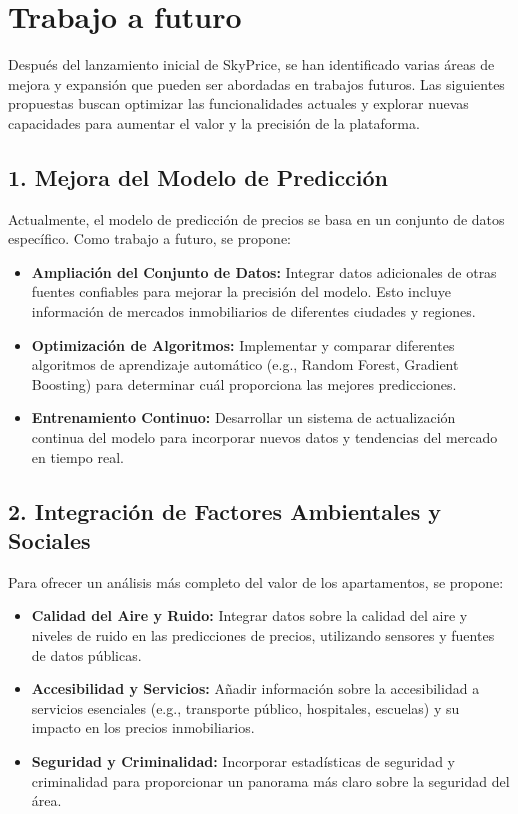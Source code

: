 \chapter{\textcolor{azulescom}{Trabajo a futuro}}

Después del lanzamiento inicial de SkyPrice, se han identificado varias áreas de mejora y expansión que pueden ser abordadas en trabajos futuros. Las siguientes propuestas buscan optimizar las funcionalidades actuales y explorar nuevas capacidades para aumentar el valor y la precisión de la plataforma.

\section*{1. Mejora del Modelo de Predicción}
Actualmente, el modelo de predicción de precios se basa en un conjunto de datos específico. Como trabajo a futuro, se propone:
\begin{itemize}
    \item \textbf{Ampliación del Conjunto de Datos:} Integrar datos adicionales de otras fuentes confiables para mejorar la precisión del modelo. Esto incluye información de mercados inmobiliarios de diferentes ciudades y regiones.
    \item \textbf{Optimización de Algoritmos:} Implementar y comparar diferentes algoritmos de aprendizaje automático (e.g., Random Forest, Gradient Boosting) para determinar cuál proporciona las mejores predicciones.
    \item \textbf{Entrenamiento Continuo:} Desarrollar un sistema de actualización continua del modelo para incorporar nuevos datos y tendencias del mercado en tiempo real.
\end{itemize}

\section*{2. Integración de Factores Ambientales y Sociales}
Para ofrecer un análisis más completo del valor de los apartamentos, se propone:
\begin{itemize}
    \item \textbf{Calidad del Aire y Ruido:} Integrar datos sobre la calidad del aire y niveles de ruido en las predicciones de precios, utilizando sensores y fuentes de datos públicas.
    \item \textbf{Accesibilidad y Servicios:} Añadir información sobre la accesibilidad a servicios esenciales (e.g., transporte público, hospitales, escuelas) y su impacto en los precios inmobiliarios.
    \item \textbf{Seguridad y Criminalidad:} Incorporar estadísticas de seguridad y criminalidad para proporcionar un panorama más claro sobre la seguridad del área.
\end{itemize}

